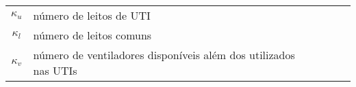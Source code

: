 \begin{table}[h!]
\begin{tabular}{|c|p{10cm}|p{4cm}|l|l}
		$\kappa_u$     & número de leitos de UTI                                                               &                           &             &   \\ \cline{1-4}              
		$\kappa_l$     & número de leitos comuns                                                               &                           &             &   \\ \cline{1-4}              
		$\kappa_v$     & número de ventiladores disponíveis  além dos utilizados nas UTIs                    &                           &             &   \\ \cline{1-4}        
	\end{tabular}
	
\end{table}  	      	      	      	      	      	      	      	      	      	      	      	      	      	      	      	      	      	      	

